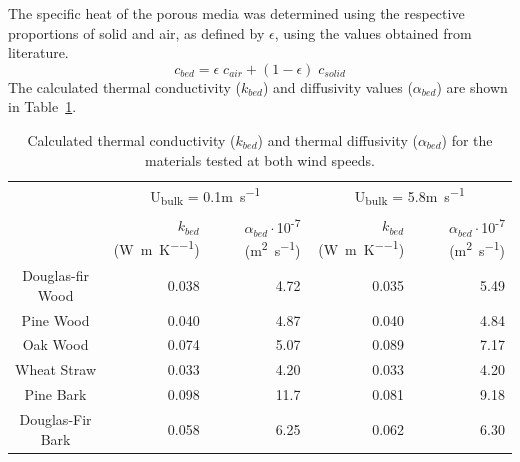     The specific heat of the porous media was determined using the respective proportions of solid and air, as defined by $\epsilon$, using the values obtained from literature.
        \begin{equation}
            c_{bed} = \epsilon \; c_{air} + \left( 1-\epsilon \right)\; c_{solid}
            \label{eqn:speciesC}
        \end{equation}
    The calculated thermal conductivity ($k_{bed}$)  and diffusivity values ($\alpha_{bed}$) are shown in Table~\ref{tab:speciesKValues}.
    \begin{table}[hpbt]
        \caption{Calculated thermal conductivity ($k_{bed}$) and thermal diffusivity ($\alpha_{bed}$) for the materials tested at both wind speeds.}
        \centering
        \begin{tabular}{crr|rr}
            \rowcolor{white}
            & 
            \multicolumn{2}{c}{U\textsubscript{bulk} = 0.1\si{\meter\per\second} } & \multicolumn{2}{c}{U\textsubscript{bulk} = 5.8\si{\meter\per\second} } \\
            \rowcolor{white}
            \multirow{-2}{*}{Material} &
            \parbox{2.0cm}{$k_{bed}$ (\si{\watt\per\meter\per\kelvin})}&
            \parbox{2.0cm}{$\alpha_{bed}\cdot$10\textsuperscript{-7} (\si{\square\meter\per\second})} &
            \parbox{2.0cm}{$k_{bed}$ (\si{\watt\per\meter\per\kelvin})} & 
            \parbox{2.0cm}{$\alpha_{bed}\cdot$10\textsuperscript{-7} (\si{\square\meter\per\second})}\\
            \hline
            Douglas-fir Wood & 0.038 & 4.72 & 0.035 & 5.49 \\
            Pine Wood        & 0.040 & 4.87 & 0.040 & 4.84\\
            Oak Wood         & 0.074 & 5.07 & 0.089 & 7.17 \\
            Wheat Straw      & 0.033 & 4.20 & 0.033 & 4.20 \\
            Pine Bark        & 0.098 & 11.7 & 0.081 & 9.18 \\
            Douglas-Fir Bark & 0.058 & 6.25 & 0.062 & 6.30 
        \end{tabular}
        \label{tab:speciesKValues}
    \end{table}
    

